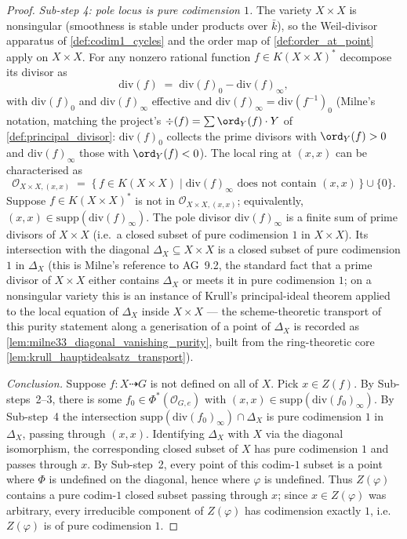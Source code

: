 \begin{proof}
  \emph{Sub-step 4: pole locus is pure codimension \(1\).} The variety \(X \times X\) is
  nonsingular (smoothness is stable under products over \(\bar k\)), so the Weil-divisor
  apparatus of \cref{def:codim1_cycles} and the order map of
  \cref{def:order_at_point} apply on \(X \times X\). For any nonzero rational function
  \(f \in K(X \times X)^\ast\) decompose its divisor as
  \[
    \mathrm{div}(f) \;=\; \mathrm{div}(f)_0 - \mathrm{div}(f)_\infty,
  \]
  with \(\mathrm{div}(f)_0\) and \(\mathrm{div}(f)_\infty\) effective and
  \(\mathrm{div}(f)_\infty = \mathrm{div}(f^{-1})_0\) (Milne's notation, matching the
  project's \(\div(f) = \sum \ord_Y(f) \cdot Y\) of
  \cref{def:principal_divisor}: \(\mathrm{div}(f)_0\) collects the prime divisors with
  \(\ord_Y(f) > 0\) and \(\mathrm{div}(f)_\infty\) those with \(\ord_Y(f) < 0\)). The local
  ring at \((x, x)\) can be characterised as
  \[
    \mathcal O_{X \times X, (x, x)}
    \;=\; \bigl\{\, f \in K(X \times X) \;\big|\;
    \mathrm{div}(f)_\infty \text{ does not contain } (x, x) \,\bigr\} \cup \{0\}.
  \]
  Suppose \(f \in K(X \times X)^\ast\) is not in \(\mathcal O_{X \times X, (x, x)}\);
  equivalently, \((x, x) \in \mathrm{supp}(\mathrm{div}(f)_\infty)\). The pole divisor
  \(\mathrm{div}(f)_\infty\) is a finite sum of prime divisors of \(X \times X\) (i.e.\ a
  closed subset of pure codimension \(1\) in \(X \times X\)). Its intersection with the
  diagonal \(\Delta_X \subseteq X \times X\) is a closed subset of pure codimension \(1\)
  in \(\Delta_X\) (this is Milne's reference to AG~9.2, the standard fact that a prime
  divisor of \(X \times X\) either contains \(\Delta_X\) or meets it in pure codimension
  \(1\); on a nonsingular variety this is an instance of Krull's principal-ideal theorem
  applied to the local equation of \(\Delta_X\) inside \(X \times X\) --- the
  scheme-theoretic transport of this purity statement along a generisation of a
  point of \(\Delta_X\) is recorded as \cref{lem:milne33_diagonal_vanishing_purity},
  built from the ring-theoretic core \cref{lem:krull_hauptidealsatz_transport}).

  \emph{Conclusion.} Suppose \(f \colon X \dashrightarrow G\) is not defined on all of
  \(X\). Pick \(x \in Z(f)\). By Sub-steps~2--3, there is some \(f_0 \in
  \Phi^\ast(\mathcal O_{G, e})\) with \((x, x) \in \mathrm{supp}(\mathrm{div}(f_0)_\infty)\).
  By Sub-step~4 the intersection \(\mathrm{supp}(\mathrm{div}(f_0)_\infty) \cap
  \Delta_X\) is pure codimension \(1\) in \(\Delta_X\), passing through \((x, x)\).
  Identifying \(\Delta_X\) with \(X\) via the diagonal isomorphism, the corresponding
  closed subset of \(X\) has pure codimension \(1\) and passes through \(x\). By Sub-step~2,
  every point of this codim-\(1\) subset is a point where \(\Phi\) is undefined on the
  diagonal, hence where \(\varphi\) is undefined. Thus \(Z(\varphi)\) contains a pure
  codim-\(1\) closed subset passing through \(x\); since \(x \in Z(\varphi)\) was arbitrary,
  every irreducible component of \(Z(\varphi)\) has codimension exactly \(1\), i.e.\
  \(Z(\varphi)\) is of pure codimension \(1\).
\end{proof}

